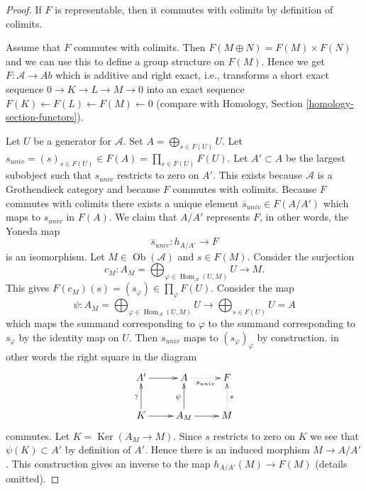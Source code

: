 \documentclass[10pt,a4paper]{amsart}
\theoremstyle{plain}
\theoremstyle{definition}
\theoremstyle{remark}
\numberwithin{equation}{subsection}
\def\Hom{\mathop{\mathrm{Hom}}\nolimits}
\def\Ob{\mathop{\mathrm{Ob}}\nolimits}
\def\Ker{\mathop{\mathrm{Ker}}}
\begin{document}
\begin{proof}
If $F$ is representable, then it commutes with colimits by definition
of colimits.

\medskip\noindent
Assume that $F$ commutes with colimits. Then $F(M \oplus N) = F(M) \times F(N)$
and we can use this to define a group structure on $F(M)$. Hence we get
$F : \mathcal{A} \to \textit{Ab}$ which is additive and right exact, i.e.,
transforms a short exact sequence $0 \to K \to L \to M \to 0$ into an exact
sequence $F(K) \leftarrow F(L) \leftarrow F(M) \leftarrow 0$ (compare with
Homology, Section \ref{homology-section-functors}).

\medskip\noindent
Let $U$ be a generator for $\mathcal{A}$. Set $A = \bigoplus_{s \in F(U)} U$.
Let $s_{univ} = (s)_{s \in F(U)} \in F(A) = \prod_{s \in F(U)} F(U)$. Let
$A' \subset A$ be the largest subobject such that $s_{univ}$ restricts to
zero on $A'$. This exists because $\mathcal{A}$ is a Grothendieck category
and because $F$ commutes with colimits. Because $F$ commutes with colimits
there exists a unique element $\overline{s}_{univ} \in F(A/A')$ which
maps to $s_{univ}$ in $F(A)$. We claim that $A/A'$ represents $F$, in
other words, the Yoneda map
$$
\overline{s}_{univ} : h_{A/A'} \longrightarrow F
$$
is an isomorphism. Let $M \in \Ob(\mathcal{A})$ and $s \in F(M)$. Consider
the surjection
$$
c_M :
A_M = \bigoplus\nolimits_{\varphi \in \Hom_\mathcal{A}(U, M)} U
\longrightarrow
M.
$$
This gives $F(c_M)(s) = (s_\varphi) \in \prod_\varphi F(U)$.
Consider the map
$$
\psi :
A_M = \bigoplus\nolimits_{\varphi \in \Hom_\mathcal{A}(U, M)} U
\longrightarrow
\bigoplus\nolimits_{s \in F(U)} U = A
$$
which maps the summand corresponding to $\varphi$ to the summand
corresponding to $s_\varphi$ by the identity map on $U$. Then $s_{univ}$
maps to $(s_\varphi)_\varphi$ by construction.
in other words the right square in the diagram
$$
\xymatrix{
A' \ar[r] &
A \ar@{..>}[r]_{s_{univ}} & F \\
K \ar[r] \ar[u]^{?} & A_M \ar[u]^\psi \ar[r] &
M \ar@{..>}[u]_s
}
$$
commutes. Let $K = \Ker(A_M \to M)$. Since $s$ restricts to zero
on $K$ we see that $\psi(K) \subset A'$ by definition of $A'$. Hence there
is an induced morphism $M \to A/A'$. This construction gives an inverse
to the map $h_{A/A'}(M) \to F(M)$ (details omitted).
\end{proof}
\end{document}

